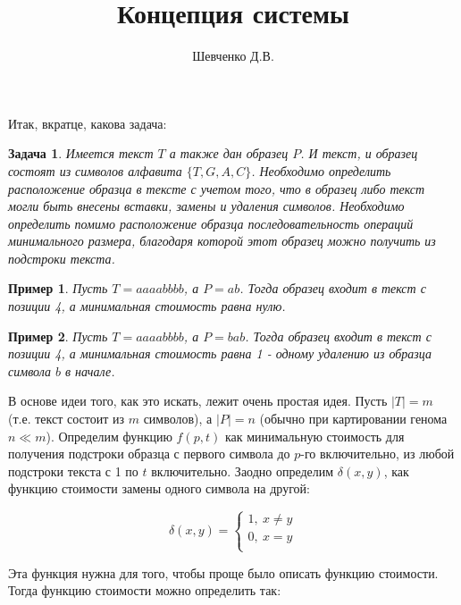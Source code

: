 \documentclass[11pt,a4paper,oneside]{article}
\begin{document}
\newtheorem{example}{Пример}
\newtheorem{task}{Задача}
\newtheorem{heuristic}{Эвристика}
\title{Концепция системы}
\author{Шевченко Д.В.}

\maketitle

Итак, вкратце, какова задача:

\begin{task}
Имеется текст $T$ а также дан образец $P$. И текст, и образец состоят из символов алфавита $\{T,G,A,C\}$. Необходимо определить расположение образца в тексте с учетом того, что в образец либо текст могли быть внесены вставки, замены и удаления символов. Необходимо определить помимо расположение образца последовательность операций минимального размера, благодаря которой этот образец можно получить из подстроки текста.
\end{task}

\begin{example}
	Пусть $T=aaaabbbb$, а $P=ab$. Тогда образец входит в текст с позиции 4, а минимальная стоимость равна нулю.
\end{example}

\begin{example}
	Пусть $T=aaaabbbb$, а $P=bab$. Тогда образец входит в текст с позиции 4, а минимальная стоимость равна 1 - одному удалению из образца символа $b$ в начале.
\end{example}

В основе идеи того, как это искать, лежит очень простая идея. Пусть $|T|=m$ (т.е. текст состоит из $m$ символов), а $|P|=n$ (обычно при картировании генома $n\ll m$). Определим функцию $f(p,t)$ как минимальную стоимость для получения подстроки образца с первого символа до $p$-го включительно, из любой подстроки текста с 1 по $t$ включительно. Заодно определим $\delta(x,y)$, как функцию стоимости замены одного символа на другой:

\begin{equation}
	\delta(x,y) = \begin{cases}
	1,\ x\neq y\\
	0,\ x = y\\
	\end{cases}
\end{equation}

Эта функция нужна для того, чтобы проще было описать функцию стоимости. Тогда функцию стоимости можно определить так:
\end{document}
